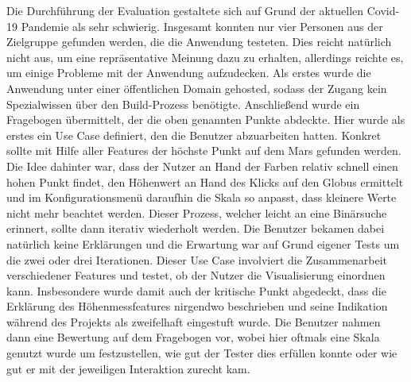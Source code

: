 Die Durchführung der Evaluation gestaltete sich auf Grund der aktuellen Covid-19 Pandemie als sehr schwierig. Insgesamt konnten nur vier Personen aus der Zielgruppe gefunden werden, die die Anwendung testeten. Dies reicht natürlich nicht aus, um eine repräsentative Meinung dazu zu erhalten, allerdings reichte es, um einige Probleme mit der Anwendung aufzudecken. Als erstes wurde die Anwendung unter einer öffentlichen Domain gehosted, sodass der Zugang kein Spezialwissen über den Build-Prozess benötigte. Anschließend wurde ein Fragebogen übermittelt, der die oben genannten Punkte abdeckte. Hier wurde als erstes ein Use Case definiert, den die Benutzer abzuarbeiten hatten. Konkret sollte mit Hilfe aller Features der höchste Punkt auf dem Mars gefunden werden. Die Idee dahinter war, dass der Nutzer an Hand der Farben relativ schnell einen hohen Punkt findet, den Höhenwert an Hand des Klicks auf den Globus ermittelt und im Konfigurationsmenü daraufhin die Skala so anpasst, dass kleinere Werte nicht mehr beachtet werden. Dieser Prozess, welcher leicht an eine Binärsuche erinnert, sollte dann iterativ wiederholt werden. Die Benutzer bekamen dabei natürlich keine Erklärungen und die Erwartung war auf Grund eigener Tests um die zwei oder drei Iterationen. Dieser Use Case involviert die Zusammenarbeit verschiedener Features und testet, ob der Nutzer die Visualisierung einordnen kann. Insbesondere wurde damit auch der kritische Punkt abgedeckt, dass die Erklärung des Höhenmessfeatures nirgendwo beschrieben und seine Indikation während des Projekts als zweifelhaft eingestuft wurde. Die Benutzer nahmen dann eine Bewertung auf dem Fragebogen vor, wobei hier oftmals eine Skala genutzt wurde um festzustellen, wie gut der Tester dies erfüllen konnte oder wie gut er mit der jeweiligen Interaktion zurecht kam.

